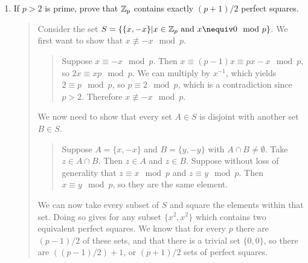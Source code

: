 \documentclass{hw}
\begin{document}
\begin{enumerate}
\item If $p>2$ is prime, prove that $\mathbb{Z}_{p}$ contains exactly $(p+1)/2$ perfect squares.
\begin{quote}
Consider the set $S=\{ \{x,-x\}|x\in\ZZ_{p}\text{ and }x\nequiv0\mod p \}$. We first want to show
that $x\nequiv-x\mod p$.
\begin{quote}
Suppose $x\equiv-x\mod p$. Then $x\equiv(p-1)x\equiv px-x\mod p$, so $2x\equiv xp\mod p$. We can
multiply by $x^{-1}$, which yields $2\equiv p\mod p$, so $p\equiv2\mod p$, which is a contradiction
since $p>2$. Therefore $x\nequiv-x\mod p$.
\end{quote}
We now need to show that every set $A\in S$ is disjoint with another set $B\in S$.
\begin{quote}
Suppose $A=\{x,-x\}$ and $B=\{y,-y\}$ with $A\cap B\neq\emptyset$. Take $z\in A\cap B$.
Then $z\in A$ and $z\in B$. Suppose without loss of generality that $z\equiv x\mod p$ and
$z\equiv y\mod p$. Then $x\equiv y\mod p$, so they are the same element.
\end{quote}
We can now take every subset of $S$ and square the elements within that set. Doing so gives for
any subset $\{ x^{2},x^{2} \}$ which contains two equivalent perfect squares. We know that for
every $p$ there are $(p-1)/2$ of these sets, and that there is a trivial set $\{0,0\}$, so there are
$((p-1)/2)+1$, or $(p+1)/2$ sets of perfect squares.
\end{quote}
\end{enumerate}
\end{document}
